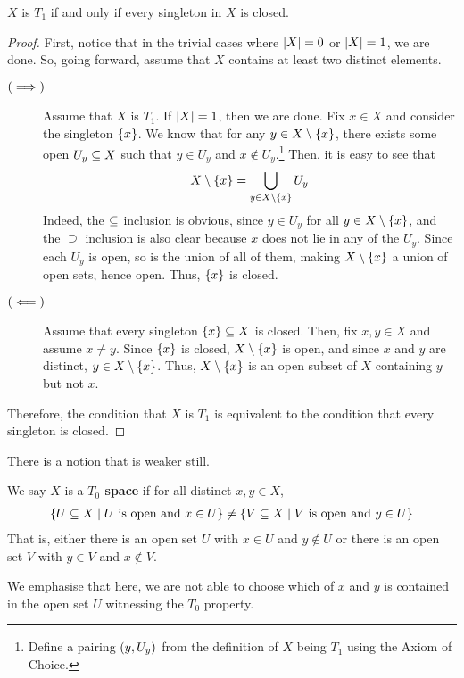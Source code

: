 \begin{boxproposition}
    $X$ is $T_1$ if and only if every singleton in $X$ is closed.
\end{boxproposition}
\begin{proof}
    First, notice that in the trivial cases where $\left\lvert X \right\rvert = 0$ or $\left\lvert X \right\rvert = 1$, we are done. So, going forward, assume that $X$ contains at least two distinct elements.
    \begin{description}
        \item[$\left( \implies \right)$] 
        Assume that $X$ is $T_1$. If $\left\lvert X \right\rvert = 1$, then we are done. Fix $x \in X$ and consider the singleton $\left\{ x \right\}$. We know that for any $y \in X \setminus \left\{ x \right\}$, there exists some open $U_y \subseteq X$ such that $y \in U_y$ and $x \notin U_y$.\footnote{Define a pairing $\left( y, U_y \right)$ from the definition of $X$ being $T_1$ using the Axiom of Choice.} Then, it is easy to see that
        \begin{align*}
            X \setminus \left\{ x \right\} = \bigcup_{y \in X \setminus \left\{ x \right\}} U_y
        \end{align*}
        Indeed, the $\subseteq$ inclusion is obvious, since $y \in U_y$ for all $y \in X \setminus \left\{ x \right\}$, and the $\supseteq$ inclusion is also clear because $x$ does not lie in any of the $U_y$. Since each $U_y$ is open, so is the union of all of them, making $X \setminus \left\{ x \right\}$ a union of open sets, hence open. Thus, $\left\{ x \right\}$ is closed.

        \item[$\left( \impliedby \right)$]
        Assume that every singleton $\left\{ x \right\} \subseteq X$ is closed. Then, fix $x, y \in X$ and assume $x \neq y$. Since $\left\{ x \right\}$ is closed, $X \setminus \left\{ x \right\}$ is open, and since $x$ and $y$ are distinct, $y \in X \setminus \left\{ x \right\}$. Thus, $X \setminus \left\{ x \right\}$ is an open subset of $X$ containing $y$ but not $x$.
    \end{description}
    Therefore, the condition that $X$ is $T_1$ is equivalent to the condition that every singleton is closed.
\end{proof}

There is a notion that is weaker still.

\begin{boxdefinition}[$T_0$ property]
    We say $X$ is a \textbf{$T_0$ space} if for all distinct $x, y \in X$,
    \begin{align*}
        \left\{ U \subseteq X \; \middle\vert \; U \text{ is open and } x \in U \right\}
        \neq
        \left\{ V \subseteq X \; \middle\vert \; V \text{ is open and } y \in U \right\}
    \end{align*}
    That is, either there is an open set $U$ with $x \in U$ and $y \notin U$ or there is an open set $V$ with $y \in V$ and $x \notin V$.
\end{boxdefinition}
\begin{remark}
    We emphasise that here, we are not able to choose which of $x$ and $y$ is contained in the open set $U$ witnessing the $T_0$ property.
\end{remark}

